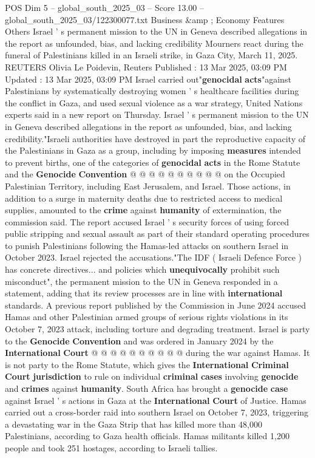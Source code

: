 \begin{textsample}{POS Dim 5 – global\_south\_2025\_03 – Score 13.00 – global\_south\_2025\_03/122300077.txt}  \label{ex:f5_pos_189}
Business \&amp ; Economy Features Others Israel ' s permanent mission to the UN in Geneva described allegations in the report as unfounded, bias, and lacking credibility Mourners react during the funeral of Palestinians killed in an Israeli strike, in Gaza City, March 11, 2025.
REUTERS Olivia Le Poidevin, Reuters Published : 13 Mar 2025, 03:09 PM Updated : 13 Mar 2025, 03:09 PM Israel carried out"\textbf{genocidal} \textbf{acts}"against Palestinians by systematically destroying women ' s healthcare facilities during the conflict in Gaza, and used sexual violence as a war strategy, United Nations experts said in a new report on Thursday.
Israel ' s permanent mission to the UN in Geneva described allegations in the report as unfounded, bias, and lacking credibility."Israeli authorities have destroyed in part the reproductive capacity of the Palestinians in Gaza as a group, including by imposing \textbf{measures} intended to prevent births, one of the categories of \textbf{genocidal} \textbf{acts} in the Rome Statute and the \textbf{Genocide} \textbf{Convention} @ @ @ @ @ @ @ @ @ @ on the Occupied Palestinian Territory, including East Jerusalem, and Israel.
Those actions, in addition to a surge in maternity deaths due to restricted access to medical supplies, amounted to the \textbf{crime} against \textbf{humanity} of extermination, the commission said.
The report accused Israel ' s security forces of using forced public stripping and sexual assault as part of their standard operating procedures to punish Palestinians following the Hamas-led attacks on southern Israel in October 2023.
Israel rejected the accusations."The IDF ( Israeli Defence Force ) has concrete directives... and policies which \textbf{unequivocally} prohibit such misconduct", the permanent mission to the UN in Geneva responded in a statement, adding that its review processes are in line with \textbf{international} standards.
A previous report published by the Commission in June 2024 accused Hamas and other Palestinian armed groups of serious rights violations in its October 7, 2023 attack, including torture and degrading treatment.
Israel is party to the \textbf{Genocide} \textbf{Convention} and was ordered in January 2024 by the \textbf{International} \textbf{Court} @ @ @ @ @ @ @ @ @ @ during the war against Hamas.
It is not party to the Rome Statute, which gives the \textbf{International} \textbf{Criminal} \textbf{Court} \textbf{jurisdiction} to rule on individual \textbf{criminal} \textbf{cases} involving \textbf{genocide} and \textbf{crimes} against \textbf{humanity}.
South Africa has brought a \textbf{genocide} \textbf{case} against Israel ' s actions in Gaza at the \textbf{International} \textbf{Court} of Justice.
Hamas carried out a cross-border raid into southern Israel on October 7, 2023, triggering a devastating war in the Gaza Strip that has killed more than 48,000 Palestinians, according to Gaza health officials.
Hamas militants killed 1,200 people and took 251 hostages, according to Israeli tallies.

\end{textsample}
